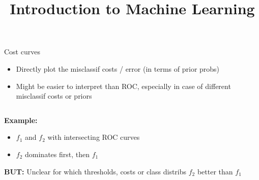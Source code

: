 \documentclass[11pt,compress,t,notes=noshow, xcolor=table]{beamer}
\title{Introduction to Machine Learning}
\institute{\href{https://compstat-lmu.github.io/lecture_i2ml/}{compstat-lmu.github.io/lecture\_i2ml}}
\date{}
\begin{document}
\sloppy

\begin{vbframe}{Cost curves}

\begin{itemize}
  \item Directly plot the misclassif costs / error (in terms of prior probs) 
  \item Might be easier to interpret than ROC, especially in case of
      different misclassif costs or priors
\end{itemize}

\lz


\begin{columns}%
\begin{column}{0.6\textwidth}
  \small
  \raggedright
  \textbf{Example:} %
  \begin{itemize}
  \item $f_1$ and $f_2$ with intersecting ROC curves
  \item $f_2$ dominates first, then $f_1$
  \end{itemize}

\lz

  \textbf{BUT:} Unclear for which thresholds, costs or class distribs $f_2$ better than $f_1$


\end{column}
\end{columns}
\end{vbframe}
\end{document}
